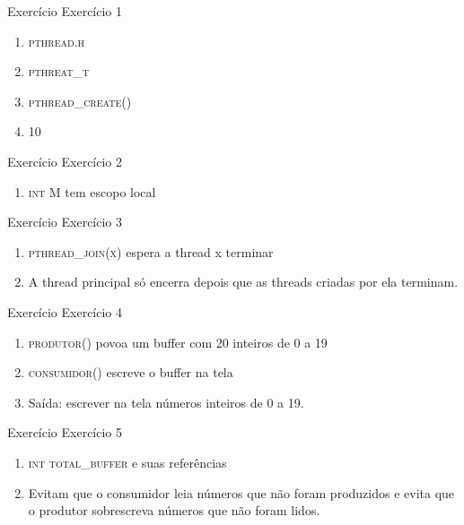 \documentclass{beamer}
\begin{document}
\begin{frame}[fragile]{Exercício}
  \centering
  \Large
  Exercício 1
  \begin{enumerate}
    \item <2-> \textsc{pthread.h}
    \item <3-> \textsc{pthreat\_t}
    \item <4-> \textsc{pthread\_create()}
    \item <5-> \textsc{10}
  \end{enumerate}
\end{frame}

\begin{frame}[fragile]{Exercício}
  \centering
  \Large
  Exercício 2
  \begin{enumerate}
    \item <2-> \textsc{int M} tem escopo local
  \end{enumerate}
\end{frame}


\begin{frame}[fragile]{Exercício}
  \centering
  \Large
  Exercício 3
  \begin{enumerate}
    \item <2-> \textsc{pthread\_join(x)} espera a thread x terminar
    \item <3-> A thread principal só encerra depois que as threads criadas por
      ela terminam.
  \end{enumerate}
\end{frame}

\begin{frame}[fragile]{Exercício}
  \centering
  \Large
  Exercício 4
  \begin{enumerate}
    \item <2-> \textsc{produtor()} povoa um buffer com 20 inteiros de 0 a 19
    \item <3-> \textsc{consumidor()} escreve o buffer na tela
    \item <4-> Saída: escrever na tela números inteiros de 0 a 19.
  \end{enumerate}
\end{frame}

\begin{frame}[fragile]{Exercício}
  \centering
  \Large
  Exercício 5
  \begin{enumerate}
    \item <2-> \textsc{int total\_buffer} e suas referências
    \item <3-> Evitam que o consumidor leia números que não foram produzidos
      e evita que o produtor sobrescreva números que não foram lidos.
  \end{enumerate}
\end{frame}
\end{document}
